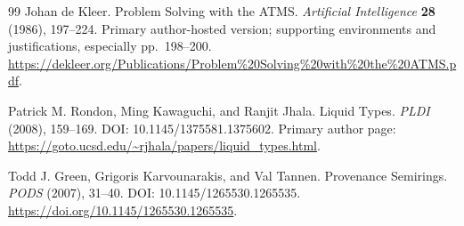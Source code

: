 \documentclass[11pt,a4paper]{article}
\theoremstyle{definition}\newtheorem{definition}[theorem]{Definition}
\theoremstyle{remark}\newtheorem{remark}[theorem]{Remark}
\begin{document}
\begin{thebibliography}{99}
 Johan de Kleer. Problem Solving with the ATMS. \emph{Artificial Intelligence} \textbf{28} (1986), 197--224. Primary author-hosted version; supporting environments and justifications, especially pp.~198--200.\newline
\url{https://dekleer.org/Publications/Problem%20Solving%20with%20the%20ATMS.pdf}.

 Patrick M. Rondon, Ming Kawaguchi, and Ranjit Jhala. Liquid Types. \emph{PLDI} (2008), 159--169. DOI: 10.1145/1375581.1375602. Primary author page:\newline
\url{https://goto.ucsd.edu/~rjhala/papers/liquid_types.html}.

 Todd J. Green, Grigoris Karvounarakis, and Val Tannen. Provenance Semirings. \emph{PODS} (2007), 31--40. DOI: 10.1145/1265530.1265535.\newline
\url{https://doi.org/10.1145/1265530.1265535}.
\end{thebibliography}
\end{document}
